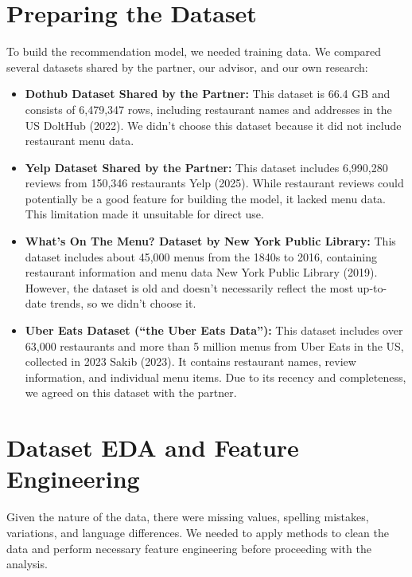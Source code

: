 \documentclass[
  11pt,
  a4paper,
  DIV=11,
  numbers=noendperiod]{scrartcl}
\providecommand{\tightlist}{%
  \setlength{\itemsep}{0pt}\setlength{\parskip}{0pt}}\usepackage{longtable,booktabs,array}
\begin{document}
\section{Preparing the Dataset}\label{preparing-the-dataset}

To build the recommendation model, we needed training data. We compared
several datasets shared by the partner, our advisor, and our own
research:

\begin{itemize}
\tightlist
\item
  \textbf{Dothub Dataset Shared by the Partner:} This dataset is 66.4 GB
  and consists of 6,479,347 rows, including restaurant names and
  addresses in the US DoltHub (2022). We didn't choose this dataset
  because it did not include restaurant menu data.
\item
  \textbf{Yelp Dataset Shared by the Partner:} This dataset includes
  6,990,280 reviews from 150,346 restaurants Yelp (2025). While
  restaurant reviews could potentially be a good feature for building
  the model, it lacked menu data. This limitation made it unsuitable for
  direct use.
\item
  \textbf{What's On The Menu? Dataset by New York Public Library:} This
  dataset includes about 45,000 menus from the 1840s to 2016, containing
  restaurant information and menu data New York Public Library (2019).
  However, the dataset is old and doesn't necessarily reflect the most
  up-to-date trends, so we didn't choose it.
\item
  \textbf{Uber Eats Dataset (``the Uber Eats Data''):} This dataset
  includes over 63,000 restaurants and more than 5 million menus from
  Uber Eats in the US, collected in 2023 Sakib (2023). It contains
  restaurant names, review information, and individual menu items. Due
  to its recency and completeness, we agreed on this dataset with the
  partner.
\end{itemize}

\section{Dataset EDA and Feature
Engineering}\label{dataset-eda-and-feature-engineering}

Given the nature of the data, there were missing values, spelling
mistakes, variations, and language differences. We needed to apply
methods to clean the data and perform necessary feature engineering
before proceeding with the analysis.
\end{document}
